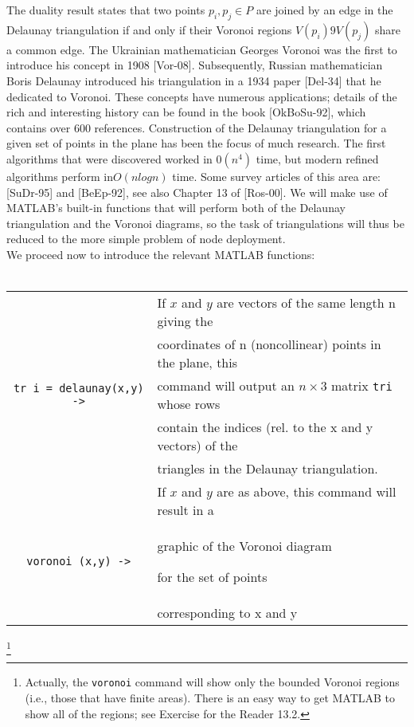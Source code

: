 \documentclass[../main.tex]{subfiles}
\begin{document}
The duality result states that two points $p_i, p_j \in P$ are joined by an edge in the Delaunay triangulation if and only if their Voronoi regions $V(p_i)9 V(p_j)$ share a common edge. The Ukrainian mathematician Georges Voronoi was the first to introduce his concept in 1908 [Vor-08]. Subsequently, Russian mathematician Boris Delaunay introduced his triangulation in a 1934 paper [Del-34] that he dedicated to Voronoi. These concepts have numerous applications; details of the rich and interesting history can be found in the book [OkBoSu-92], which contains over 600 references. Construction of the Delaunay triangulation for a given set of points in the plane has been the focus of much research. The first algorithms that were discovered worked in $0(n^4)$ time, but modern refined algorithms perform in$ O(n log n)$ time. Some survey articles of this area are: [SuDr-95] and [BeEp-92], see also Chapter 13 of [Ros-00]. We will make use of MATLAB's built-in functions that will perform both of the Delaunay triangulation and the Voronoi diagrams, so the task of triangulations will thus be reduced to the more simple problem of node deployment. 
\\
We proceed now to introduce the relevant MATLAB functions: 
\\
\\
\begin{center}
\begin{tabular}{|c|l|}
\hline
&If $x$ and $y$ are vectors of the same length n giving the\\
&coordinates of n (noncollinear) points in the plane, this \\
\texttt{tr i = delaunay(x,y) ->}&command will output an $n \times 3$ matrix \texttt{tri} whose rows \\
&contain the indices (rel. to the x and y vectors) of the \\
&triangles in the Delaunay triangulation. \\
\hline
&If $x$ and $y$ are as above, this command will result in a\\
\texttt{voronoi (x,y) ->}&graphic of the Voronoi diagram

for the set of points
\\
&corresponding to x and y \\
\hline
\end{tabular}
\end{center}
\footnote{Actually, the \texttt{voronoi} command will show only the bounded Voronoi regions (i.e., those that have finite areas). There is an easy way to get MATLAB to show all of the regions; see Exercise for the Reader 13.2.}
\end{document}
